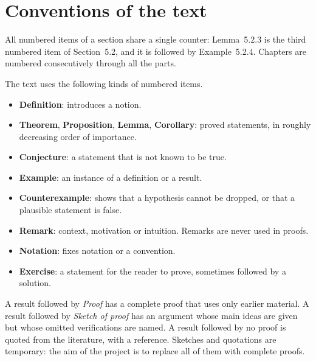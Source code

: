 \section{Conventions of the text}\label{introduction:section-conventions}

\begin{notation}\label{introduction:notation-numbering}
All numbered items of a section share a single counter: Lemma~5.2.3 is the
third numbered item of Section~5.2, and it is followed by Example~5.2.4.
Chapters are numbered consecutively through all the parts.
\end{notation}

\begin{notation}\label{introduction:notation-environments}
The text uses the following kinds of numbered items.
\begin{itemize}
\item \textbf{Definition}: introduces a notion.
\item \textbf{Theorem}, \textbf{Proposition}, \textbf{Lemma},
\textbf{Corollary}: proved statements, in roughly decreasing order of
importance.
\item \textbf{Conjecture}: a statement that is not known to be true.
\item \textbf{Example}: an instance of a definition or a result.
\item \textbf{Counterexample}: shows that a hypothesis cannot be dropped, or
that a plausible statement is false.
\item \textbf{Remark}: context, motivation or intuition. Remarks are never used
in proofs.
\item \textbf{Notation}: fixes notation or a convention.
\item \textbf{Exercise}: a statement for the reader to prove, sometimes followed
by a solution.
\end{itemize}
\end{notation}

\begin{remark}\label{introduction:remark-proofs}
A result followed by \emph{Proof} has a complete proof that uses only earlier
material. A result followed by \emph{Sketch of proof} has an argument whose
main ideas are given but whose omitted verifications are named. A result
followed by no proof is quoted from the literature, with a reference.
Sketches and quotations are temporary: the aim of the project is to replace
all of them with complete proofs.
\end{remark}

